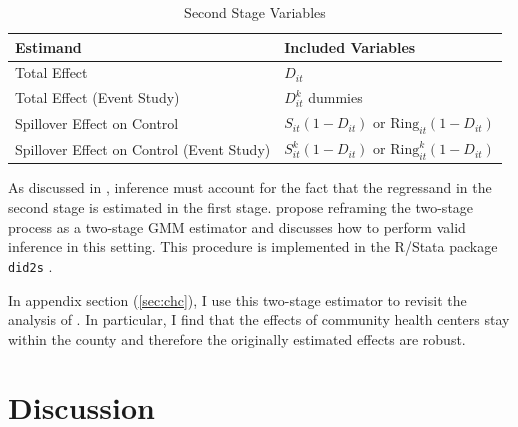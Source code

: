 \documentclass[11pt]{article}
\begin{document}
\begin{table}[!tb]
    \caption{Second Stage Variables}
    \label{tab:second_stage}

    \centering
    \begin{threeparttable}
        \begin{tabular}{@{} *{2}{l} @{}}
            \toprule
            \textbf{Estimand} & \textbf{Included Variables} \\

            \midrule
            Total Effect & $D_{it}$ \\
            Total Effect (Event Study) & $D_{it}^k$ dummies \\
            Spillover Effect on Control & $S_{it}(1 - D_{it})$ or $\text{Ring}_{it}(1-D_{it})$ \\
            Spillover Effect on Control (Event Study) & $S_{it}^k(1 - D_{it})$ or $\text{Ring}_{it}^k(1-D_{it})$ \\
            \bottomrule
        \end{tabular}
    \end{threeparttable}
\end{table}

As discussed in \citet{Gardner_2021}, inference must account for the fact that the regressand in the second stage is estimated in the first stage. \citet{Gardner_2021} propose reframing the two-stage process as a two-stage GMM estimator and discusses how to perform valid inference in this setting. This procedure is implemented in the R/Stata package \texttt{did2s} \citep{did2s}. 

In appendix section (\ref{sec:chc}), I use this two-stage estimator to revisit the analysis of \citet{Bailey_Goodman_Bacon_2015}. In particular, I find that the effects of community health centers stay within the county and therefore the originally estimated effects are robust. 

\section{Discussion}
\label{sec:conclusion}
\end{document}
